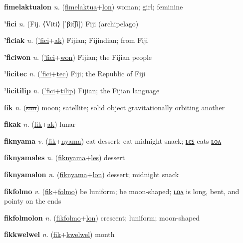 \textbf{\hypertarget{fimelaktualon}{fimelaktualon}} \textit{n.} (\hyperlink{fimelaktua}{fimelaktua}+\allowbreak \hyperlink{lon}{lon})
woman; girl; feminine

\textbf{\hypertarget{'fici}{'fici}} \textit{n.} (Fij. ⟨Viti⟩ [ˈβit͡ʃi])
Fiji (archipelago)

\textbf{\hypertarget{'ficiak}{'ficiak}} \textit{n.} (\hyperlink{'fici}{'fici}+\allowbreak \hyperlink{ak}{ak})
Fijian; Fijindian; from Fiji

\textbf{\hypertarget{'ficiwon}{'ficiwon}} \textit{n.} (\hyperlink{'fici}{'fici}+\allowbreak \hyperlink{won}{won})
Fijian; the Fijian people

\textbf{\hypertarget{'ficitec}{'ficitec}} \textit{n.} (\hyperlink{'fici}{'fici}+\allowbreak \hyperlink{tec}{tec})
Fiji; the Republic of Fiji

\textbf{\hypertarget{'ficitilip}{'ficitilip}} \textit{n.} (\hyperlink{'fici}{'fici}+\allowbreak \hyperlink{tilip}{tilip})
Fijian; the Fijian language

\textbf{\hypertarget{fik}{fik}} \textit{n.} (\hyperlink{sun}{\sout{sun}})
moon; satellite; solid object gravitationally orbiting another

\textbf{\hypertarget{fikak}{fikak}} \textit{n.} (\hyperlink{fik}{fik}+\allowbreak \hyperlink{ak}{ak})
lunar

\textbf{\hypertarget{fiknyama}{fiknyama}} \textit{v.} (\hyperlink{fik}{fik}+\allowbreak \hyperlink{nyama}{nyama})
eat dessert; eat midnight snack; \hyperlink{fiknyamales}{ʟєꜱ} eats \hyperlink{fiknyamalon}{ʟᴏᴧ}

\textbf{\hypertarget{fiknyamales}{fiknyamales}} \textit{n.} (\hyperlink{fiknyama}{fiknyama}+\allowbreak \hyperlink{les}{les})
dessert

\textbf{\hypertarget{fiknyamalon}{fiknyamalon}} \textit{n.} (\hyperlink{fiknyama}{fiknyama}+\allowbreak \hyperlink{lon}{lon})
dessert; midnight snack

\textbf{\hypertarget{fikfolmo}{fikfolmo}} \textit{v.} (\hyperlink{fik}{fik}+\allowbreak \hyperlink{folmo}{folmo})
be luniform; be moon-shaped; \hyperlink{fikfolmolon}{ʟᴏᴧ} is long, bent, and pointy on the ends

\textbf{\hypertarget{fikfolmolon}{fikfolmolon}} \textit{n.} (\hyperlink{fikfolmo}{fikfolmo}+\allowbreak \hyperlink{lon}{lon})
crescent; luniform; moon-shaped

\textbf{\hypertarget{fikkwelwel}{fikkwelwel}} \textit{n.} (\hyperlink{fik}{fik}+\allowbreak \hyperlink{kwelwel}{kwelwel})
month

